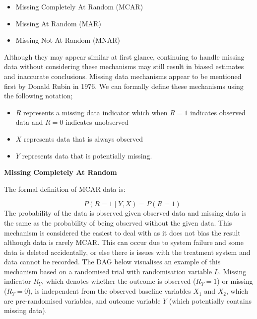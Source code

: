 \documentclass{article}
\providecommand{\tightlist}{%
  \setlength{\itemsep}{0pt}\setlength{\parskip}{0pt}}
\begin{document}
\begin{itemize}
\tightlist
\item
  Missing Completely At Random (MCAR)
\item
  Missing At Random (MAR)
\item
  Missing Not At Random (MNAR)
\end{itemize}

Although they may appear similar at first glance, continuing to handle
missing data without considering these mechanisms may still result in
biased estimates and inaccurate conclusions. Missing data mechanisms
appear to be mentioned first by Donald Rubin in 1976. We can formally
define these mechanisms using the following notation;

\begin{itemize}
\tightlist
\item
  \(R\) represents a missing data indicator which when \(R=1\) indicates
  observed data and \(R=0\) indicates unobserved
\item
  \(X\) represents data that is always observed
\item
  \(Y\) represents data that is potentially missing.
\end{itemize}

\textbf{Missing Completely At Random}

The formal definition of MCAR data is:

\[\quad P(R = 1 \mid Y, X) = P(R = 1)\] The probability of the data is
observed given observed data and missing data is the same as the
probability of being observed without the given data. This mechanism is
considered the easiest to deal with as it does not bias the result
although data is rarely MCAR. This can occur due to system failure and
some data is deleted accidentally, or else there is issues with the
treatment system and data cannot be recorded. The DAG below visualises
an example of this mechanism based on a randomised trial with
randomisation variable \(L\). Missing indicator \(R_Y\), which denotes
whether the outcome is observed (\(R_Y = 1\)) or missing (\(R_Y = 0\)),
is independent from the observed baseline variables \(X_1\) and \(X_2\),
which are pre-randomised variables, and outcome variable \(Y\) (which
potentially contains missing data).
\end{document}
